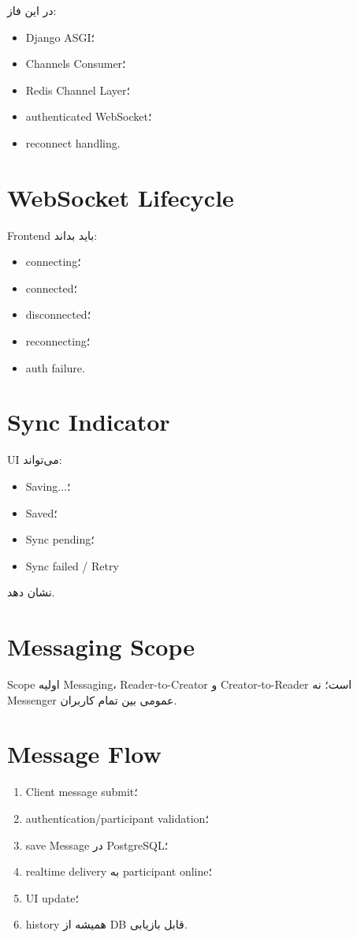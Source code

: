 در این فاز:
\begin{itemize}
  \item Django ASGI؛
  \item Channels Consumer؛
  \item Redis Channel Layer؛
  \item authenticated WebSocket؛
  \item reconnect handling.
\end{itemize}

\section{WebSocket Lifecycle}

Frontend باید بداند:
\begin{itemize}
  \item connecting؛
  \item connected؛
  \item disconnected؛
  \item reconnecting؛
  \item auth failure.
\end{itemize}

\section{Sync Indicator}

UI می‌تواند:
\begin{itemize}
  \item Saving...؛
  \item Saved؛
  \item Sync pending؛
  \item Sync failed / Retry
\end{itemize}
نشان دهد.

\section{Messaging Scope}

\begin{decisionbox}
Scope اولیه Messaging، Reader-to-Creator و Creator-to-Reader است؛ نه Messenger عمومی بین تمام کاربران.
\end{decisionbox}

\section{Message Flow}

\begin{enumerate}
  \item Client message submit؛
  \item authentication/participant validation؛
  \item save Message در PostgreSQL؛
  \item realtime delivery به participant online؛
  \item UI update؛
  \item history همیشه از DB قابل بازیابی.
\end{enumerate}

